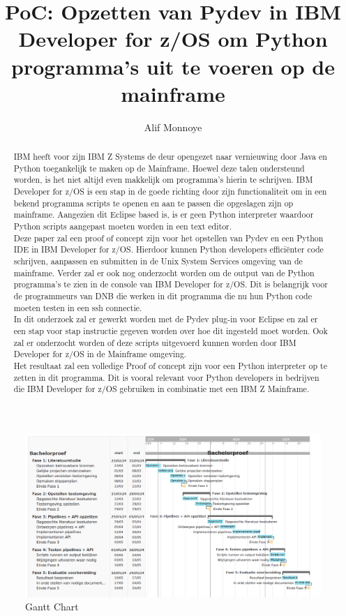 \documentclass{hogent-article}
\title{PoC: Opzetten van Pydev in IBM Developer for z/OS om Python programma's uit te voeren op de mainframe}
\author{Alif Monnoye}
\begin{document}
\begin{abstract}
    IBM heeft voor zijn IBM Z Systems de deur opengezet naar vernieuwing door Java en Python toegankelijk te maken op de Mainframe. Hoewel deze talen ondersteund worden, is het niet altijd even makkelijk om programma's hierin te schrijven. IBM Developer for z/OS is een stap in de goede richting door zijn functionaliteit om in een bekend programma scripts te openen en aan te passen die opgeslagen zijn op mainframe. Aangezien dit Eclipse based is, is er geen Python interpreter waardoor Python scripts aangepast moeten worden in een text editor. \\
    Deze paper zal een proof of concept zijn voor het opstellen van Pydev en een Python IDE in IBM Developer for z/OS. Hierdoor kunnen Python developers efficiënter code schrijven, aanpassen en submitten in de Unix System Services omgeving van de mainframe. Verder zal er ook nog onderzocht worden om de output van de Python programma's te zien in de console van IBM Developer for z/OS. Dit is belangrijk voor de programmeurs van DNB die werken in dit programma die nu hun Python code moeten testen in een ssh connectie. \\
    In dit onderzoek zal er gewerkt worden met de Pydev plug-in voor Eclipse en zal er een stap voor stap instructie gegeven worden over hoe dit ingesteld moet worden. Ook zal er onderzocht worden of deze scripts uitgevoerd kunnen worden door IBM Developer for z/OS in de Mainframe omgeving. \\
    Het resultaat zal een volledige Proof of concept zijn voor een Python interpreter op te zetten in dit programma. Dit is vooral relevant voor Python developers in bedrijven die IBM Developer for z/OS gebruiken in combinatie met een IBM Z Mainframe. 
\end{abstract}
\tableofcontents



\printbibliography[heading=bibintoc]

\cleardoublepage
\begin{figure}[pt!]
    \centering
    \includegraphics[width=550pt]{GanttChart.png}
    \caption{Gantt Chart}
    \label{fig}
\end{figure}
\end{document}
